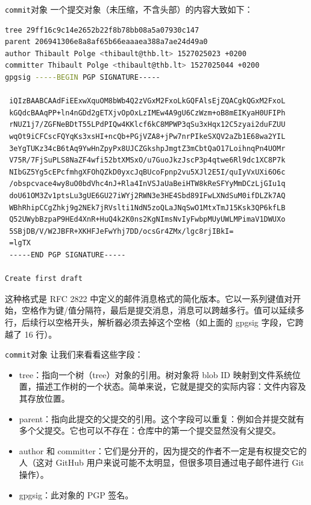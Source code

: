 \documentclass[aspectratio=169,xcolor=dvipsnames]{beamer}
\theoremstyle{remark}
\begin{document}
\begin{frame}{\texttt{commit}对象}
一个提交对象（未压缩，不含头部）的内容大致如下：
\begin{lstlisting}[language=bash]
tree 29ff16c9c14e2652b22f8b78bb08a5a07930c147
parent 206941306e8a8af65b66eaaaea388a7ae24d49a0
author Thibault Polge <thibault@thb.lt> 1527025023 +0200
committer Thibault Polge <thibault@thb.lt> 1527025044 +0200
gpgsig -----BEGIN PGP SIGNATURE-----

 iQIzBAABCAAdFiEExwXquOM8bWb4Q2zVGxM2FxoLkGQFAlsEjZQACgkQGxM2FxoL
 kGQdcBAAqPP+ln4nGDd2gETXjvOpOxLzIMEw4A9gU6CzWzm+oB8mEIKyaH0UFIPh
 rNUZ1j7/ZGFNeBDtT55LPdPIQw4KKlcf6kC8MPWP3qSu3xHqx12C5zyai2duFZUU
 wqOt9iCFCscFQYqKs3xsHI+ncQb+PGjVZA8+jPw7nrPIkeSXQV2aZb1E68wa2YIL
 3eYgTUKz34cB6tAq9YwHnZpyPx8UJCZGkshpJmgtZ3mCbtQaO17LoihnqPn4UOMr
 V75R/7FjSuPLS8NaZF4wfi52btXMSxO/u7GuoJkzJscP3p4qtwe6Rl9dc1XC8P7k
 NIbGZ5Yg5cEPcfmhgXFOhQZkD0yxcJqBUcoFpnp2vu5XJl2E5I/quIyVxUXi6O6c
 /obspcvace4wy8uO0bdVhc4nJ+Rla4InVSJaUaBeiHTW8kReSFYyMmDCzLjGIu1q
 doU61OM3Zv1ptsLu3gUE6GU27iWYj2RWN3e3HE4Sbd89IFwLXNdSuM0ifDLZk7AQ
 WBhRhipCCgZhkj9g2NEk7jRVslti1NdN5zoQLaJNqSwO1MtxTmJ15Ksk3QP6kfLB
 Q52UWybBzpaP9HEd4XnR+HuQ4k2K0ns2KgNImsNvIyFwbpMUyUWLMPimaV1DWUXo
 5SBjDB/V/W2JBFR+XKHFJeFwYhj7DD/ocsGr4ZMx/lgc8rjIBkI=
 =lgTX
 -----END PGP SIGNATURE-----

Create first draft
\end{lstlisting}
这种格式是 RFC 2822 中定义的邮件消息格式的简化版本。它以一系列键值对开始，空格作为键/值分隔符，最后是提交消息，消息可以跨越多行。值可以延续多行，后续行以空格开头，解析器必须去掉这个空格（如上面的 gpgsig 字段，它跨越了 16 行）。
\end{frame}

\begin{frame}{\texttt{commit}对象}
让我们来看看这些字段：
\begin{itemize}
    \item tree：指向一个树（tree）对象的引用。树对象将 blob ID 映射到文件系统位置，描述工作树的一个状态。简单来说，它就是提交的实际内容：文件内容及其存放位置。
    \item parent：指向此提交的父提交的引用。这个字段可以重复：例如合并提交就有多个父提交。它也可以不存在：仓库中的第一个提交显然没有父提交。
    \item author 和 committer：它们是分开的，因为提交的作者不一定是有权提交它的人（这对 GitHub 用户来说可能不太明显，但很多项目通过电子邮件进行 Git 操作）。
    \item gpgsig：此对象的 PGP 签名。
\end{itemize}
\end{frame}
\end{document}
